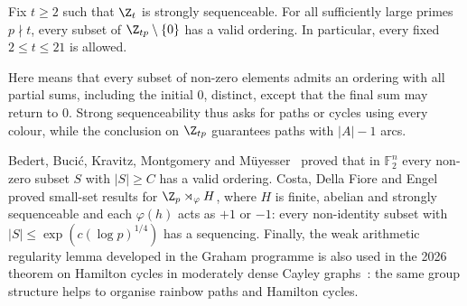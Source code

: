 \begin{theorem}\label{thm:cdfl-tp}
Fix $t\geq2$ such that $\Z_t$ is strongly sequenceable. For all sufficiently large primes $p\nmid t$, every subset of $\Z_{tp}\setminus\{0\}$ has a valid ordering. In particular, every fixed $2\leq t\leq21$ is allowed.
\end{theorem}

Here  means that every subset of non-zero elements admits an ordering with all partial sums, including the initial $0$, distinct, except that the final sum may return to $0$. Strong sequenceability thus asks for paths or cycles using every colour, while the conclusion on $\Z_{tp}$ guarantees paths with $|A|-1$ arcs.


Bedert, Buci\'c, Kravitz, Montgomery and M\"uyesser~\cite{bbkmm25} proved that in $\mathbb F_2^n$ every non-zero subset $S$ with $|S|\geq C$ has a valid ordering. Costa, Della Fiore and Engel~\cite{cdfe25} proved small-set results for $\Z_p\rtimes_\varphi H$, where $H$ is finite, abelian and strongly sequenceable and each $\varphi(h)$ acts as $+1$ or $-1$: every non-identity subset with $|S|\leq\exp(c(\log p)^{1/4})$ has a sequencing. Finally, the weak arithmetic regularity lemma developed in the Graham programme is also used in the 2026 theorem on Hamilton cycles in moderately dense Cayley graphs~\cite[\S1]{bdmp26}: the same group structure helps to organise rainbow paths and Hamilton cycles.
